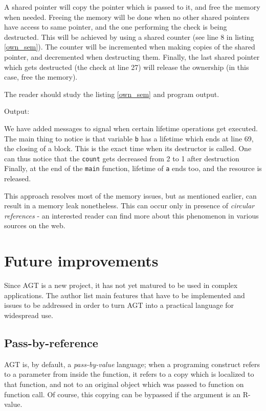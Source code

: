 \documentclass[times, utf8, diplomski]{fer}
\theoremstyle{definition}
\newcommand{\textcode}[3]{
    
}
\begin{document}
A shared pointer will copy the pointer which is passed to it, and free the memory when needed. 
Freeing the memory will be done when no other shared pointers have access to same pointer,
and the one performing the check is being destructed.
This will be achieved by using a shared counter (see line 8 in listing \ref{own_sem}).
The counter will be incremented when making copies of the shared pointer,
and decremented when destructing them.
Finally, the last shared pointer which gets destructed (the check at line 27) will release
the ownership (in this case, free the memory).

The reader should study the listing \ref{own_sem} and program output.

\textcode{\resdir/programs/shared_pointer.agt}{own_sem}{Shared pointers - out}

Output:
\textcode{\resdir/programs/shared_pointer.out}{own_sem_out}{Shared pointer - out}

We have added messages to signal when certain lifetime operations get executed.
The main thing to notice is that variable \texttt{b} has a lifetime which ends
at line 69, the closing of a block. This is the exact time when its destructor is called.
One can thus notice that the \texttt{count} gets decreased from 2 to 1 after destruction
Finally, at the end of the \texttt{main} function, lifetime of \texttt{a} ends too,
and the resource is released.

This approach resolves most of the memory issues, but as mentioned earlier, can result
in a memory leak nonetheless. This can occur only in presence of \textit{circular references} -
an interested reader can find more about this phenomenon in various sources on the web.


\chapter{Future improvements}\label{chap:improv}

Since AGT is a new project, it has not yet matured to be used in complex applications.
The author list main features that have to be implemented and issues to be addressed
in order to turn AGT into a practical language for widespread use.

\section{Pass-by-reference}

AGT is, by default, a \textit{pass-by-value} language; when a programing construct 
refers to a parameter from inside the function, it refers to a copy which is localized to that function,
and not to an original object which was passed to function on function call.
Of course, this copying can be bypassed if the argument is an R-value.
\end{document}
